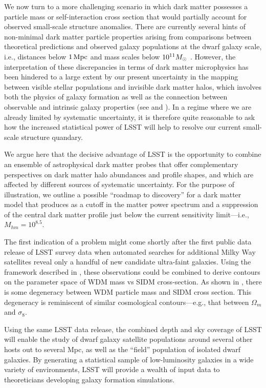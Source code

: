 \documentclass[modern,linenumbers]{aastex62}
\begin{document}
We now turn to a more challenging scenario in which dark matter possesses a particle mass or self-interaction cross section that would partially account for observed small-scale structure anomalies.
There are currently several hints of non-minimal dark matter particle properties arising from comparisons between theoretical predictions and observed galaxy populations at the dwarf galaxy scale, i.e., distances below $1 \mathrm{\,Mpc}$ and mass scales below $10^{11} M_\odot$ \citep[reviewed by][]{BuckleyPeter:2017,Bullock:2017xww}.
However, the interpretation of these discrepancies in terms of dark matter microphysics has been hindered to a large extent by our present uncertainty in the mapping between visible stellar populations and invisible dark matter halos, which involves both the physics of galaxy formation as well as the connection between observable and intrinsic galaxy properties (see  and ).
In a regime where we are already limited by systematic uncertainty, it is therefore quite reasonable to ask how the increased statistical power of LSST will help to resolve our current small-scale structure quandary.

We argue here that the decisive advantage of LSST is the opportunity to combine an ensemble of astrophysical dark matter probes that offer complementary perspectives on dark matter halo abundances and profile shapes, and which are affected by different sources of systematic uncertainty.
For the purpose of illustration, we outline a possible ``roadmap to discovery'' for a dark matter model that produces as a cutoff in the matter power spectrum and a suppression of the central dark matter profile just below the current sensitivity limit---i.e., $M_{hm} = 10^{8.5}$.

The first indication of a problem might come shortly after the first public data release of LSST survey data when automated searches for additional Milky Way satellites reveal only a handful of new candidate ultra-faint galaxies. 
Using the framework described in , these observations could be combined to derive contours on the parameter space of WDM mass vs SIDM cross-section.
As shown in , there is some degeneracy between WDM particle mass and SIDM cross section.
This degeneracy is reminiscent of similar cosmological contours---e.g., that between $\Omega_m$ and $\sigma_8$.

Using the same LSST data release, the combined depth and sky coverage of LSST will enable the study of dwarf galaxy satellite populations around several other hosts out to several Mpc, as well as the ``field'' population of isolated dwarf galaxies.
By generating a statistical sample of low-luminosity galaxies in a wide variety of environments, LSST will provide a wealth of input data to theoreticians developing galaxy formation simulations.
\end{document}
